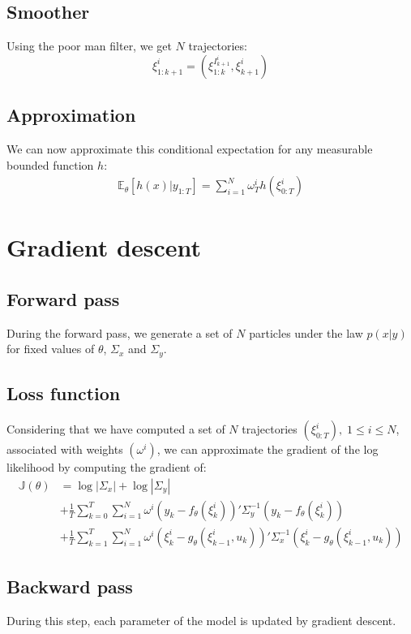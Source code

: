 \documentclass[10pt,a4paper]{report}
\begin{document}
\subsection{Smoother}
Using the poor man filter, we get $N$ trajectories:
$$\xi_{1:k+1}^{i} = (\xi_{1:k}^{I_{k+1}^i}, \xi_{k+1}^i)$$

\subsection{Approximation}
We can now approximate this conditional expectation for any measurable bounded function $h$:
\begin{align*}
	\mathbb{E}_\theta \left[ h(x) | y_{1:T} \right] = \sum_{i=1}^N \omega_T^i h(\xi_{0:T}^i)
\end{align*}

\section{Gradient descent}
\label{sec:gradient_descent}

\subsection{Forward pass}
During the forward pass, we generate a set of $N$ particles under the law $p(x|y)$ for fixed values of $\theta$, $\Sigma_x$ and $\Sigma_y$.

\subsection{Loss function}
Considering that we have computed a set of $N$ trajectories $(\xi^i_{0:T}),\;1 \leq i \leq N$, associated with weights $(\omega^i)$, we can approximate the gradient of the log likelihood by computing the gradient of:
\begin{align*}
	\mathbb{J}(\theta) & = \log |\Sigma_x| + \log |\Sigma_y|                                                                                                        \\
			   & + \frac{1}{T}\sum_{k=0}^T \sum_{i=1}^N \omega^i (y_k - f_\theta(\xi_k^i))' \Sigma_y^{-1} (y_k - f_\theta(\xi_k^i))                         \\
                           & + \frac{1}{T}\sum_{k=1}^T \sum_{i=1}^N \omega^i (\xi_k^i - g_\theta(\xi_{k-1}^i, u_k))'\Sigma_x^{-1}(\xi_k^i - g_\theta(\xi_{k-1}^i, u_k))
\end{align*}

\subsection{Backward pass}
During this step, each parameter of the model is updated by gradient descent.
\end{document}
